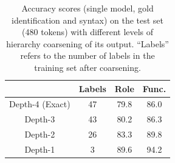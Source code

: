 \begin{table}[]
    \setlength{\tabcolsep}{10pt} %
    \renewcommand{\arraystretch}{1.5}
    \centering
    \begin{tabular}{|c|c|c|c|}
        \hline
            & Labels & Role & Func.\\ \hline
         Depth-4 (Exact) & 47 & 79.8 & 86.0\\ \hline
         Depth-3 & 43 & 80.2 & 86.3 \\ \hline
         Depth-2 & 26 & 83.3 & 89.8 \\ \hline
         Depth-1 & 3 & 89.6 & 94.2 \\ \hline
          
    \end{tabular}
    \caption{Accuracy scores (single model, gold identification and syntax) on the test set (480 tokens) with different levels of hierarchy coarsening of its output. “Labels” refers to the number of labels in the training set after coarsening.}
    \label{tab:coarsening}
\end{table}

